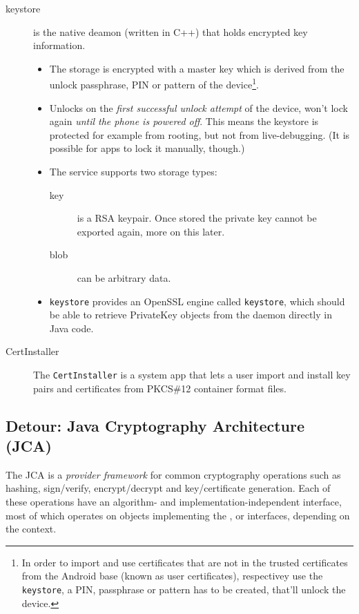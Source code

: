 \documentclass[a4paper,draft]{scrartcl}
\begin{document}
\begin{description}
		\item[keystore] is the native deamon (written in C++) that holds encrypted key information.
			\begin{itemize}
				\item The storage is encrypted with a master key which is derived from the unlock passphrase, PIN or pattern of the device\footnote{In order to import and use certificates that are not in the trusted certificates from the Android base (known as user certificates), respectivey use the \texttt{keystore}, a PIN, passphrase or pattern has to be created, that'll unlock the device.}.
				\item Unlocks on the \emph{first successful unlock attempt} of the device, won't lock again \emph{until the phone is powered off}. This means the keystore is protected for example from rooting, but not from live-debugging. (It is possible for apps to lock it manually, though.)
				\item The service supports two storage types:
				\begin{description}
					\item[key] is a RSA keypair. Once stored the private key cannot be exported again, more on this later.
					\item[blob] can be arbitrary data.
				\end{description}
				\item \texttt{keystore} provides an OpenSSL engine called \texttt{keystore}, which should be able to retrieve PrivateKey objects from the daemon directly in Java code.
			\end{itemize}
		\item [CertInstaller] The \texttt{CertInstaller} is a system app that lets a user import and install key pairs and certificates from PKCS\#12 container format files. %
	\end{description}

	\subsection*{Detour: Java Cryptography Architecture (JCA)}
		The JCA is a {\em provider framework} for common cryptography operations such as hashing, sign/verify, encrypt/decrypt and key/certificate generation. Each of these operations have an algorithm- and implementation-independent interface, most of which operates on objects implementing the ,  or  interfaces, depending on the context.
\end{document}
